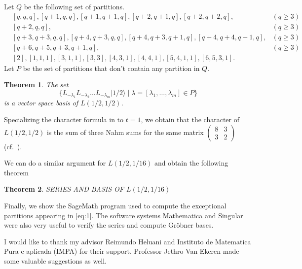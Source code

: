 \documentclass[12pt, a4paper]{article}
\newtheorem{theorem}{Theorem}[section]
\theoremstyle{remark}
\newcommand{\vachalf}{|1/2\rangle}
\begin{document}
Let $Q$ be the following set of partitions.
\begin{align}
  \nonumber
  &[q, q, q], [q + 1, q, q], [q + 1, q + 1, q], [q + 2, q + 1, q], [q + 2, q + 2, q], &(q \ge 3) \\
  \nonumber
  &[q + 2, q, q], &(q \ge 3) \\
  \label{eq:1}
  &[q + 3, q + 3, q, q], [q + 4, q + 3, q, q],  [q + 4, q + 3, q + 1, q], [q + 4, q + 4, q + 1, q], &(q \ge 3)\\
  \nonumber
  &[q + 6, q + 5, q + 3, q + 1, q], &(q \ge 3) \\
  \nonumber
  &[2], [1, 1, 1], [3, 1, 1], [3, 3], [4, 3, 1], [4, 4, 1], [5, 4, 1, 1], [6, 5, 3, 1].
\end{align}
Let $P$ be the set of partitions that don't contain any partition in $Q$.

\begin{theorem}
  \label{thr:4}
  The set
  \begin{equation*}
    \{L_{-\lambda_1}L_{-\lambda_2}\dots L_{-\lambda_m}\vachalf \mid \lambda=[\lambda_1, \dots, \lambda_m] \in P\}
  \end{equation*}
  is a vector space basis of $L(1/2, 1/2)$.
\end{theorem}

Specializing the character formula in  to $t = 1$, we obtain that the character of $L(1/2, 1/2)$ is the sum of three Nahm sums for the same matrix $\left( \begin{smallmatrix} 8 & 3 \\ 3 & 2\end{smallmatrix} \right)$ (cf.\ \cite{Nahm2007}).

We can do a similar argument for $L(1/2, 1/16)$ and obtain the following theorem

\begin{theorem}
  \label{thr:5}
  SERIES AND BASIS OF $L(1/2,1/16)$
\end{theorem}

Finally, we show the SageMath \cite{sagemath} program used to compute the exceptional partitions appearing in \eqref{eq:1}.
The software systems Mathematica \cite{Mathematica} and Singular \cite{Singular} were also very useful to verify the series and compute Gr\"{o}bner bases.

I would like to thank my advisor Reimundo Heluani and Instituto de Matematica Pura e aplicada (IMPA) for their support.
Professor Jethro Van Ekeren made some valuable suggestions as well.
\end{document}
